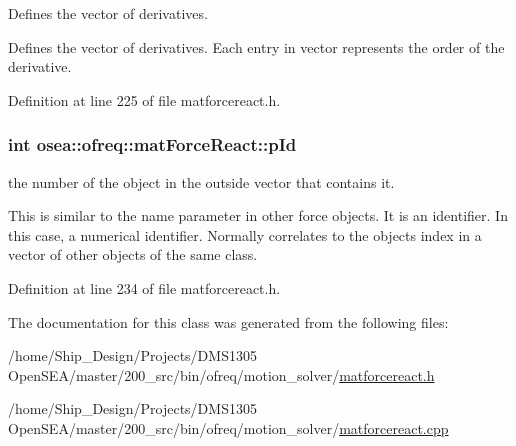 Defines the vector of derivatives. 

Defines the vector of derivatives. Each entry in vector represents the order of the derivative. 

Definition at line 225 of file matforcereact.\-h.

\hypertarget{classosea_1_1ofreq_1_1mat_force_react_a890a6fbcf9900d4a37ff05533f350f50}{
\subsubsection[{p\-Id}]{\setlength{\rightskip}{0pt plus 5cm}int osea\-::ofreq\-::mat\-Force\-React\-::p\-Id\hspace{0.3cm}{\ttfamily [protected]}}}\label{classosea_1_1ofreq_1_1mat_force_react_a890a6fbcf9900d4a37ff05533f350f50}


the number of the object in the outside vector that contains it. 

This is similar to the name parameter in other force objects. It is an identifier. In this case, a numerical identifier. Normally correlates to the objects index in a vector of other objects of the same class. 

Definition at line 234 of file matforcereact.\-h.



The documentation for this class was generated from the following files\-:\begin{DoxyCompactItemize}
\item 
/home/\-Ship\-\_\-\-Design/\-Projects/\-D\-M\-S1305 Open\-S\-E\-A/master/200\-\_\-src/bin/ofreq/motion\-\_\-solver/\hyperlink{matforcereact_8h}{matforcereact.\-h}\item 
/home/\-Ship\-\_\-\-Design/\-Projects/\-D\-M\-S1305 Open\-S\-E\-A/master/200\-\_\-src/bin/ofreq/motion\-\_\-solver/\hyperlink{matforcereact_8cpp}{matforcereact.\-cpp}\end{DoxyCompactItemize}
